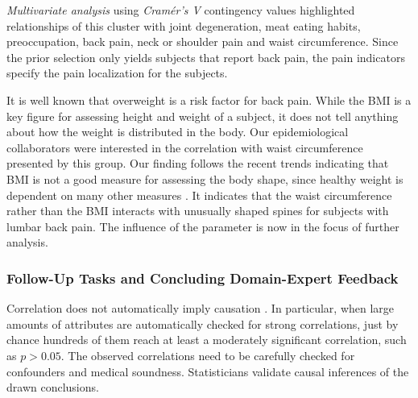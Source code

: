 \documentclass[journal]{style/vgtc} 			          %
\begin{document}
\emph{Multivariate analysis} using \emph{Cram\'{e}r's V} contingency values highlighted relationships of this cluster with joint degeneration, meat eating habits, preoccupation, back pain, neck or shoulder pain and waist circumference.
%
Since the prior selection only yields subjects that report back pain, the pain indicators specify the pain localization for the subjects.

It is well known that overweight is a risk factor for back pain.
%
While the BMI is a key figure for assessing height and weight of a subject, it does not tell anything about how the weight is distributed in the body.
%
Our epidemiological collaborators were interested in the correlation with waist circumference presented by this group.
%
Our finding follows the recent trends indicating that BMI is not a good measure for assessing the body shape, since healthy weight is dependent on many other measures \cite{Ahima2013}.
%
It indicates that the waist circumference rather than the BMI interacts with unusually shaped spines for subjects with lumbar back pain.
%
The influence of the parameter is now in the focus of further analysis.

\subsubsection{Follow-Up Tasks and Concluding Domain-Expert Feedback}
%
Correlation does not automatically imply causation \cite{Tufte2003}.
%
In particular, when large amounts of attributes are automatically checked for strong correlations, just by chance hundreds of them reach at least a moderately significant correlation, such as $p>0.05$.
%
The observed correlations need to be carefully checked for confounders and medical soundness.
%
Statisticians validate causal inferences of the drawn conclusions.
\end{document}
